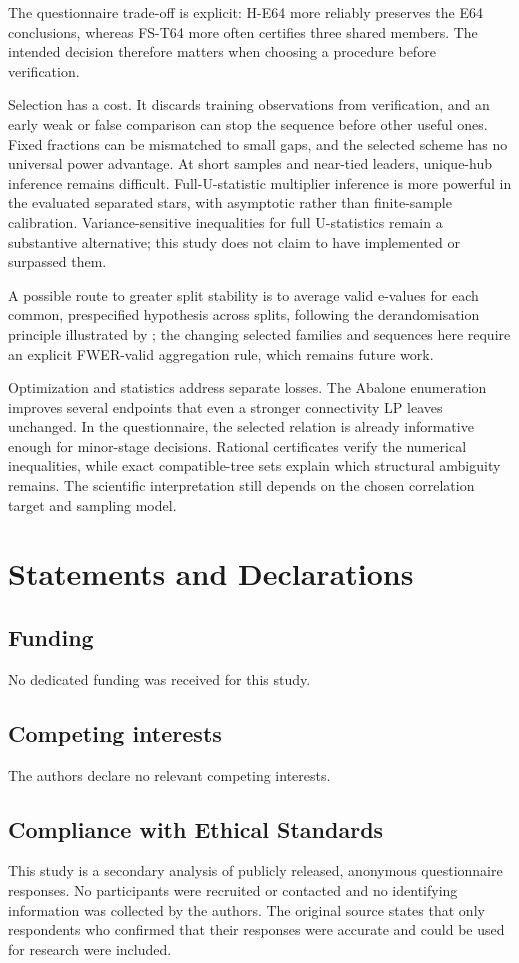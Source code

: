 \documentclass[11pt]{article}
\theoremstyle{plain}
\theoremstyle{definition}\newtheorem{remark}{Remark}\newtheorem{example}{Example}
\begin{document}
The questionnaire trade-off is explicit: H-E64 more reliably preserves the E64 conclusions, whereas FS-T64 more often certifies three shared members. The intended decision therefore matters when choosing a procedure before verification.

Selection has a cost. It discards training observations from verification, and an early weak or false comparison can stop the sequence before other useful ones. Fixed fractions can be mismatched to small gaps, and the selected scheme has no universal power advantage. At short samples and near-tied leaders, unique-hub inference remains difficult. Full-U-statistic multiplier inference is more powerful in the evaluated separated stars, with asymptotic rather than finite-sample calibration. Variance-sensitive inequalities for full U-statistics \citep{peel2010} remain a substantive alternative; this study does not claim to have implemented or surpassed them.

A possible route to greater split stability is to average valid e-values for each common, prespecified hypothesis across splits, following the derandomisation principle illustrated by \citet{ren2024}; the changing selected families and sequences here require an explicit FWER-valid aggregation rule, which remains future work.

Optimization and statistics address separate losses. The Abalone enumeration improves several endpoints that even a stronger connectivity LP leaves unchanged. In the questionnaire, the selected relation is already informative enough for minor-stage decisions. Rational certificates verify the numerical inequalities, while exact compatible-tree sets explain which structural ambiguity remains. The scientific interpretation still depends on the chosen correlation target and sampling model.

\section*{Statements and Declarations}
\subsection*{Funding}No dedicated funding was received for this study.
\subsection*{Competing interests}The authors declare no relevant competing interests.
\subsection*{Compliance with Ethical Standards}
This study is a secondary analysis of publicly released, anonymous questionnaire responses. No participants were recruited or contacted and no identifying information was collected by the authors. The original source states that only respondents who confirmed that their responses were accurate and could be used for research were included.
\end{document}
